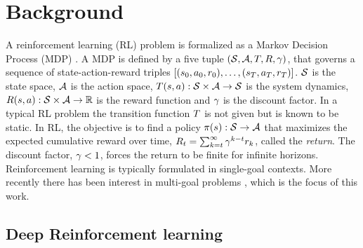 \section{Background}

A reinforcement learning (RL) problem is formalized as a Markov Decision Process (MDP)
\citep{sutton1998reinforcement}. A MDP is defined by a five tuple $(\mathcal{S},
\mathcal{A}, T, R, \gamma)$, that governs
a sequence of state-action-reward triples $[(s_0, a_0,
r_0), \dots, (s_T, a_T, r_T)]$.
$\mathcal{S}$ is the
state space, $\mathcal{A}$ is the action space, $T(s,a) : \mathcal{S} \times \mathcal{A}
\rightarrow \mathcal{S}$ is the system dynamics, $R(s, a) : \mathcal{S} \times \mathcal{A}
\rightarrow \mathbb{R} $ is the reward function and $\gamma$ is the discount
factor.
In a typical RL problem the transition function $T$ is not given but is
known to be static.
In RL, the objective is to find a policy $\pi(s): \mathcal{S}
\rightarrow \mathcal{A}$ that
maximizes the expected cumulative
reward over time, $R_t = \sum_{k=t}^{\infty} \gamma^{k-t}r_{k}$, called the
\emph{return}. The discount factor, $\gamma < 1$, forces
the return to be finite for infinite horizons.  
Reinforcement learning is typically formulated in single-goal
contexts. More recently there has been interest in multi-goal
problems
\citep{andrychowicz2017hindsight,pong2018temporal,plappert2018multi}, which is
the focus of this work.


\subsection{Deep Reinforcement learning}

